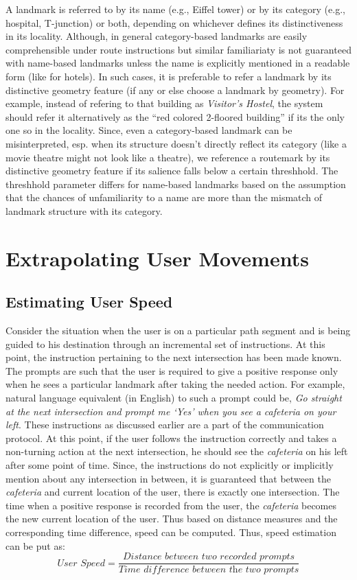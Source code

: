 \documentclass{iitkthesis}
\begin{document}
A landmark is referred to by its name (e.g., Eiffel tower) or by its category (e.g., hospital, T-junction) or both, depending on whichever defines its distinctiveness in its locality. Although, in general category-based landmarks are easily comprehensible under route instructions but similar familiariaty is not guaranteed with name-based landmarks unless the name is explicitly mentioned in a readable form (like for hotels). In such cases, it is preferable to refer a landmark by its distinctive geometry feature (if any or else choose a landmark by geometry). For example, instead of refering to that building as \textit{Visitor's Hostel}, the system should refer it alternatively as the ``red colored 2-floored building'' if its the only one so in the locality. Since, even a category-based landmark can be misinterpreted, esp. when its structure doesn't directly reflect its category (like a movie theatre might not look like a theatre), we reference a routemark by its distinctive geometry feature if its salience falls below a certain threshhold. The threshhold parameter differs for name-based landmarks based on the assumption that the chances of unfamiliarity to a name are more than the mismatch of landmark structure with its category.
\section{Extrapolating User Movements}
\subsection{Estimating User Speed}
Consider the situation when the user is on a particular path segment and is being guided to his destination through an incremental set of instructions. At this point, the instruction pertaining to the next intersection has been made known. The prompts are such that the user is required to give a positive response only when he sees a particular landmark after taking the needed action. For example, natural language equivalent (in English) to such a prompt could be, \textit{Go straight at the next intersection and prompt me `Yes' when you see a cafeteria on your left}. These instructions as discussed earlier are a part of the communication protocol. At this point, if the user follows the instruction correctly and takes a non-turning action at the next intersection, he should see the \textit{cafeteria} on his left after some point of time. Since, the instructions do not explicitly or implicitly mention about any intersection in between, it is guaranteed that between the \textit{cafeteria} and current location of the user, there is exactly one intersection. The time when a positive response is recorded from the user, the \textit{cafeteria} becomes the new current location of the user. Thus based on distance measures and the corresponding time difference, speed can be computed. Thus, speed estimation can be put as:
\[\displaystyle \textit{User Speed}=\frac{\textit{Distance between two recorded prompts}}{\textit{Time difference between the two prompts}}\]
\end{document}
